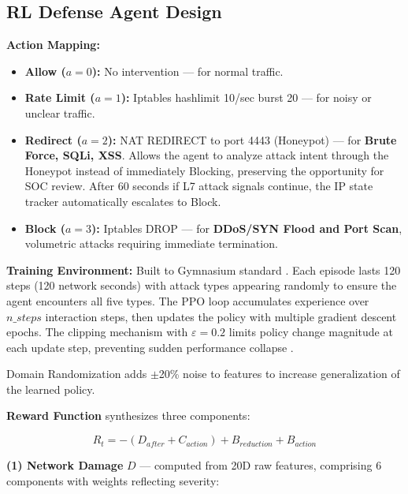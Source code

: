 \documentclass[12pt,a4paper]{report}
\begin{document}
\subsection{RL Defense Agent Design}

\textbf{Action Mapping:}
\begin{itemize}
  \item \textbf{Allow ($a=0$):} No intervention --- for normal traffic.
  \item \textbf{Rate Limit ($a=1$):} Iptables hashlimit 10/sec burst 20 --- for noisy or unclear traffic.
  \item \textbf{Redirect ($a=2$):} NAT REDIRECT to port 4443 (Honeypot) --- for \textbf{Brute Force, SQLi, XSS}. Allows the agent to analyze attack intent through the Honeypot instead of immediately Blocking, preserving the opportunity for SOC review. After 60 seconds if L7 attack signals continue, the IP state tracker automatically escalates to Block.
  \item \textbf{Block ($a=3$):} Iptables DROP --- for \textbf{DDoS/SYN Flood and Port Scan}, volumetric attacks requiring immediate termination.
\end{itemize}

\textbf{Training Environment:} Built to Gymnasium standard \cite{gymnasium2023}. Each episode lasts 120 steps (120 network seconds) with attack types appearing randomly to ensure the agent encounters all five types. The PPO loop accumulates experience over $n\_steps$ interaction steps, then updates the policy with multiple gradient descent epochs. The clipping mechanism with $\varepsilon = 0.2$ limits policy change magnitude at each update step, preventing sudden performance collapse \cite{schulmanPPO2017}.

Domain Randomization adds $\pm$20\% noise to features to increase generalization of the learned policy.

\textbf{Reward Function} synthesizes three components:

\begin{equation}
R_t = -(D_{after} + C_{action}) + B_{reduction} + B_{action}
\end{equation}

\textbf{(1) Network Damage} $D$ --- computed from 20D raw features, comprising 6 components with weights reflecting severity:
\end{document}
